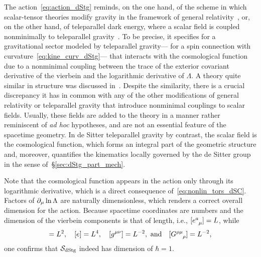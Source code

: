 \documentclass[
final,
11pt,
a4paper,
DIV=11,
headinclude=true,
footinclude=false,
bibliography=totoc,
twoside=true,  %
BCOR=5mm
]{scrbook}
\begin{document}
The action~\eqref{eq:action_dStg} reminds, on the one hand, of 
the scheme in which scalar-tensor theories modify gravity in the 
framework of general relativity~\cite{Brans:1961sx, Dicke:1961gz, 
  Bergmann:1968ve, Sotiriou:2008rp, Tsujikawa:2010zza}, or, on 
the other hand, of teleparallel dark energy, where a scalar field 
is coupled nonminimally to teleparallel 
gravity~\cite{Geng:2011aj, Geng:2011ka, Xu:2012jf}. To be 
precise, it specifies for a gravitational sector modeled by 
teleparallel gravity--- for a spin connection with 
curvature~\eqref{eq:kine_curv_dStg}--- that interacts with the 
cosmological function due to a nonminimal coupling between the 
trace of the exterior covariant derivative of the vierbein and 
the logarithmic derivative of $\Lambda$. A theory quite similar 
in structure was discussed in~\cite{Otalora:2014aoa}. Despite the 
similarity, there is a crucial discrepancy it has in common with 
any of the other modifications of general relativity or 
teleparallel gravity that introduce nonminimal couplings to 
scalar fields. Usually, these fields are added to the theory in 
a manner rather reminiscent of \emph{ad hoc} hypotheses, and are 
not an essential feature of the spacetime geometry. In de Sitter 
teleparallel gravity by contrast, the scalar field is the 
cosmological function, which forms an integral part of the 
geometric structure and, moreover, quantifies the kinematics 
locally governed by the de Sitter group in the sense 
of~\S\ref{sec:dStg_part_mech}.

Note that the cosmological function appears in the action only 
through its logarithmic derivative, which is a direct consequence 
of~\eqref{eq:nonlin_tors_dSC}. Factors of $\partial_\mu \ln \Lambda$ 
are naturally dimensionless, which renders a correct overall 
dimension for the action. Because spacetime coordinates are 
numbers and the dimension of the vierbein components is that of 
length, i.e., $[e\ind{^a_\mu}] = L$, while
\begin{equation*}
  [\kappa] = L^2,\quad
  [e] = L^4,\quad
  [g^{\mu\nu}] = L^{-2},~\text{and}\quad
  [G\ind{^{\rho\mu}_\rho}] = L^{-2},
\end{equation*}
one confirms that $\mathcal{S}_\mathrm{dStg}$ indeed has dimension of 
$\hbar = 1$.
 
\end{document}
